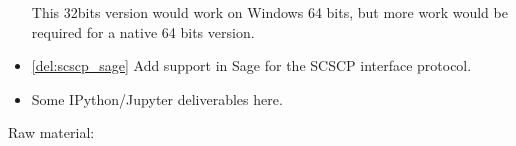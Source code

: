 \begin{Workpackage}{\thewpno}
\begin{WPDeliverables}
\begin{itemize}
  This 32bits version would work on Windows 64 bits, but more work
  would be required for a native 64 bits version.
\item \ref{del:scscp_sage} Add support in Sage for the SCSCP interface
  protocol.
\item Some IPython/Jupyter deliverables here.
\end{itemize}
\end{WPDeliverables}
Raw material:


\end{Workpackage}
